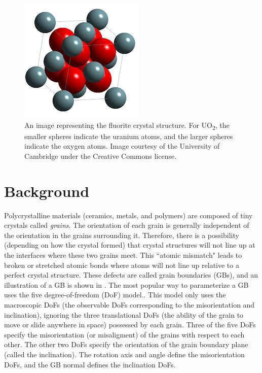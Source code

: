 \documentclass[twoside,senior]{BYUPhys}
\begin{document}
\begin{figure}[ht!]
\centering
\includegraphics[scale=1.0]{Images/UO2}
\caption[Example of the fluorite crystal structure.]{\label{fig:uo2Lattice}An image representing the fluorite crystal structure.  For UO\textsubscript{2}, the smaller spheres indicate the uranium atoms, and the larger spheres indicate the oxygen atoms.  Image courtesy of the University of Cambridge under the Creative Commons license.}
\end{figure}

\section{Background\label{intro:background}}
Polycrystalline materials (ceramics, metals, and polymers) are composed of tiny crystals called \emph{grains}.  The orientation of each grain is generally independent of the orientation in the grains surrounding it. Therefore, there is a possibility (depending on how the crystal formed\cite{callister2003}) that crystal structures will not line up at the interfaces where these two grains meet.  This ``atomic mismatch"\cite{callister2003} leads to broken or stretched atomic bonds where atoms will not line up relative to a perfect crystal structure.  These defects are called grain boundaries (GBs), and an illustration of a GB is shown in . The most popular way to parameterize a GB uses the five degree-of-freedom (DoF) model.\cite{patala2013, lejcek2010, homer2015, bulatov2014, harbison2015, rohrer2011}.  This model only uses the macroscopic DoFs (the observable DoFs corresponding to the misorientation and inclination), ignoring the three translational DoFs (the ability of the grain to move or slide anywhere in space) possessed by each grain.  Three of the five DoFs specify the misorientation (or misaligment) of the grains with respect to each other.  The other two DoFs specify the orientation of the grain boundary plane (called the inclination).  The rotation axis and angle define the misorientation DoFs, and the GB normal defines the inclination DoFs.\cite{lejcek2010}
\end{document}
